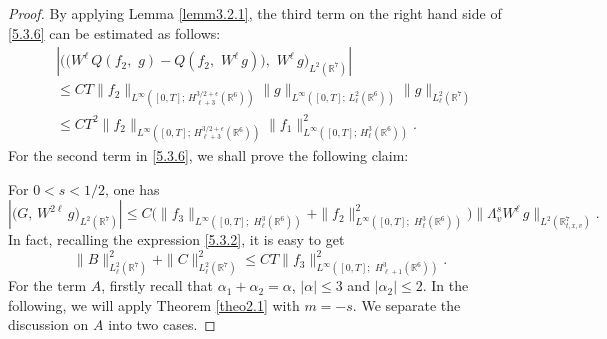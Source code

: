 \documentclass{amsart}[12pt, article]
\begin{document}
\begin{proof}
By applying Lemma \ref{lemm3.2.1}, the third term on the right hand side
 of \eqref{5.3.6} can be estimated as follows:
\begin{align*}
&\left|\Big(\big(W^\ell\, Q(f_2,\,\,g)-Q(f_2,\,\,W^\ell\,
g)\big),\,\,W^{\ell}\, g\Big)_{L^2({{{\mathbb R}}}^7)}\right|\\
& \leq C T \|f_2\|_{L^\infty([0, T];\,
H^{3/2+\epsilon}_{\ell+3}({{{\mathbb R}}}^6))}\|g\|_{L^\infty([0, T];\,
L^2_{\ell} ({{{\mathbb R}}}^6))} \|g\|_{L^2_\ell({{{\mathbb R}}}^7)}\\
& \leq C T^2 \|f_2\|_{L^\infty([0, T];\,
H^{3/2+\epsilon}_{\ell+3}({{{\mathbb R}}}^6))}\|f_1\|^2_{L^\infty([0, T];\,
H^3_{\ell} ({{{\mathbb R}}}^6))}.
\end{align*}
For the second term in \eqref{5.3.6}, we shall prove the following claim:

 For $0<s<1/2$, one has
\begin{equation}\label{5.3.7}
\left|\Big(G,\, W^{2\ell}\, g\Big)_{L^2({{{\mathbb R}}}^7)}\right|\leq
C\Big(\|f_3\|_{L^\infty([0, T];\,\, H^{3}_{\ell}({{{\mathbb R}}}^6))}+
\|f_2\|^2_{L^\infty([0, T];\,\, H^{3}_{\ell}({{{\mathbb R}}}^6))}\Big)
\|\Lambda^s_v W^{\ell}\, g\|_{L^2({{{\mathbb R}}}^7_{t, x, v})}.
\end{equation}
In fact, recalling the expression \eqref{5.3.2}, it is easy to get
$$
\|B\|^2_{L^2_\ell({{{\mathbb R}}}^7)}+\|C\|^2_{L^2_\ell({{{\mathbb R}}}^7)}\leq C T
\|f_3\|^2_{L^\infty([0, T];\,\,H^3_{\ell+1}({{{\mathbb R}}}^6))}.
$$
For the term $A$, firstly recall that $\alpha_1+\alpha_2=\alpha$,
$|\alpha|\leq 3$ and $|\alpha_2|\leq 2$. In the following,
 we will apply Theorem \ref{theo2.1} with $m=-s$. We separate the discussion
 on $A$ into
two cases.


\end{proof}
\end{document}
